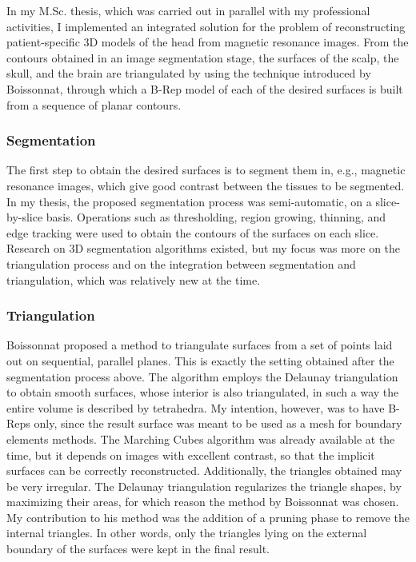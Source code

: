 \documentclass[a4paper]{article}
\begin{document}
In my M.Sc. thesis, which was carried out in parallel with my professional activities, I implemented an integrated solution for the problem of reconstructing patient-specific 3D models of the head from magnetic resonance images. From the contours obtained in an image segmentation stage, the surfaces of the scalp, the skull, and the brain are triangulated by using the technique introduced by Boissonnat, through which a B-Rep model of each of the desired surfaces is built from a sequence of planar contours. 

\subsubsection{Segmentation}

The first step to obtain the desired surfaces is to segment them in, e.g., magnetic resonance images, which give good contrast between the tissues to be segmented. In my thesis, the proposed segmentation process was semi-automatic, on a slice-by-slice basis. Operations such as thresholding, region growing, thinning, and edge tracking were used to obtain the contours of the surfaces on each slice. Research on 3D segmentation algorithms existed, but my focus was more on the triangulation process and on the integration between segmentation and triangulation, which was relatively new at the time.

\subsubsection{Triangulation}

Boissonnat proposed a method to triangulate surfaces from a set of points laid out on sequential, parallel planes. This is exactly the setting obtained after the segmentation process above. The algorithm employs the Delaunay triangulation to obtain smooth surfaces, whose interior is also triangulated, in such a way the entire volume is described by tetrahedra. My intention, however, was to have B-Reps only, since the result surface was meant to be used as a mesh for boundary elements methods. The Marching Cubes algorithm was already available at the time, but it depends on images with excellent contrast, so that the implicit surfaces can be correctly reconstructed. Additionally, the triangles obtained may be very irregular. The Delaunay triangulation regularizes the triangle shapes, by maximizing their areas, for which reason the method by Boissonnat was chosen. My contribution to his method was the addition of a pruning phase to remove the internal triangles. In other words, only the triangles lying on the external boundary of the surfaces were kept in the final result.
\end{document}
